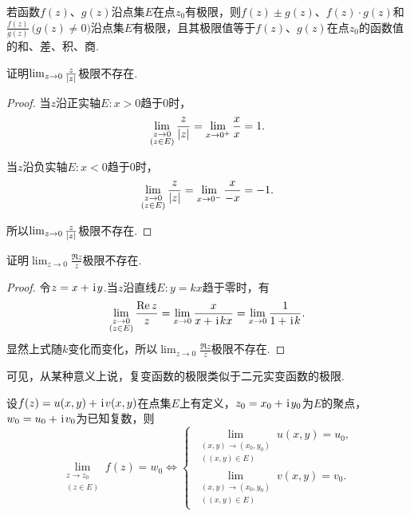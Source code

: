 \begin{theorem}
若函数\(f(z)\)、\(g(z)\)沿点集\(E\)在点\(z_0\)有极限，则\(f(z) \pm g(z)\)、\(f(z) \cdot g(z)\)和\(\frac{f(z)}{g(z)}\ \bigl(g(z) \neq 0\bigr)\)沿点集\(E\)有极限，且其极限值等于\(f(z)\)、\(g(z)\)在点\(z_0\)的函数值的和、差、积、商.
\end{theorem}

\begin{example}
证明\(\lim_{z\to0} \frac{z}{\abs{z}}\)极限不存在.
\begin{proof}
当\(z\)沿正实轴\(E: x > 0\)趋于\(0\)时，\begin{equation*}
\lim_{\substack{z\to0 \\ (z \in E)}} \frac{z}{\abs{z}}
= \lim_{x\to0^+} \frac{x}{x} = 1.
\end{equation*}

当\(z\)沿负实轴\(E: x < 0\)趋于\(0\)时，\begin{equation*}
\lim_{\substack{z\to0 \\ (z \in E)}} \frac{z}{\abs{z}}
= \lim_{x\to0^-} \frac{x}{-x} = -1.
\end{equation*}

所以\(\lim_{z\to0} \frac{z}{\abs{z}}\)极限不存在.
\end{proof}
\end{example}

\begin{example}
证明\(\lim_{z\to0} \frac{\Re z}{z}\)极限不存在.
\begin{proof}
令\(z = x + \kern1pt\mathrm{i}\kern1pt y\).当\(z\)沿直线\(E: y = kx\)趋于零时，有\begin{equation*}
\lim_{\substack{z\to0 \\ (z \in E)}} \frac{\Re z}{z}
= \lim_{x\to0} \frac{x}{x + \kern1pt\mathrm{i}\kern1pt kx}
= \lim_{x\to0} \frac{1}{1+\kern1pt\mathrm{i}\kern1pt k}.
\end{equation*}显然上式随\(k\)变化而变化，所以\(\lim_{z\to0} \frac{\Re z}{z}\)极限不存在.
\end{proof}
\end{example}

可见，从某种意义上说，复变函数的极限类似于二元实变函数的极限.
\begin{theorem}\label{theorem:复变函数.复变函数极限与二元实变函数的关系}
设\(f(z)=u(x,y)+\kern1pt\mathrm{i}\kern1pt v(x,y)\)在点集\(E\)上有定义，\(z_0=x_0+\kern1pt\mathrm{i}\kern1pt y_0\)为\(E\)的聚点，\(w_0=u_0+\kern1pt\mathrm{i}\kern1pt v_0\)为已知复数，则\begin{equation*}
\lim_{\substack{z \to z_0 \\ (z \in E)}} f(z) = w_0
\iff
\left\{ \begin{array}{l}
\lim_{\substack{(x,y)\to(x_0,y_0) \\ ((x,y) \in E)}} u(x,y) = u_0, \\
\lim_{\substack{(x,y)\to(x_0,y_0) \\ ((x,y) \in E)}} v(x,y) = v_0.
\end{array} \right.
\end{equation*}
\end{theorem}

